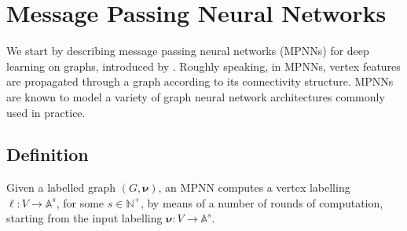 
\section{Message Passing Neural Networks}\label{sec:MPNNs}
We start by describing message passing neural networks (MPNNs) for  deep
learning on graphs, introduced by \cite{GilmerSRVD17}. Roughly speaking, in
MPNNs, vertex features are propagated through a graph according to its
connectivity structure. MPNNs are known to model a variety of graph neural
network architectures commonly used in practice.

\subsection{Definition}
Given a labelled graph $( G,\pmb{\nu})$, an MPNN computes a vertex
labelling $\pmb{\ell}:V\to \mathbb{A}^{s}$, for some $s\in\mathbb{N}^+$, by
means of a number of rounds of computation, starting from the input labelling
$\pmb{\nu}:V\to\mathbb{A}^s$.

